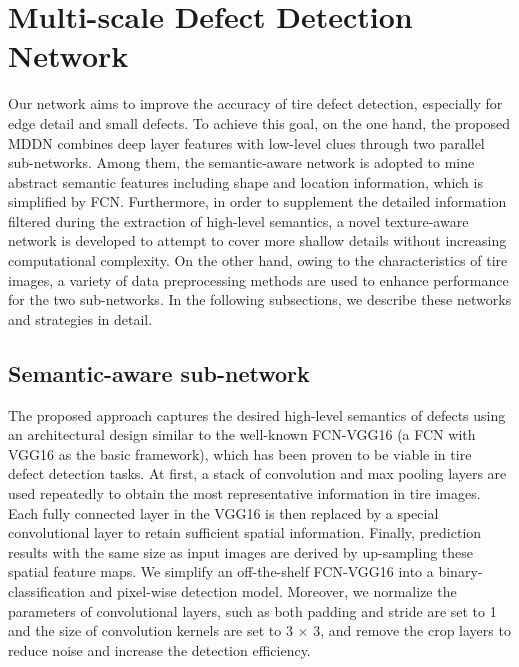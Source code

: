 \documentclass{article}
\begin{document}

\section{Multi-scale Defect Detection Network}
\label{sec:format}

Our network aims to improve the accuracy of tire defect detection, especially for edge detail and small defects. To achieve this goal, on the one hand, the proposed MDDN combines deep layer features with low-level clues through two parallel sub-networks. Among them, the semantic-aware network is adopted to mine abstract semantic features including shape and location information, which is simplified by FCN. Furthermore, in order to supplement the detailed information filtered during the extraction of high-level semantics, a novel texture-aware network is developed to attempt to cover more shallow details without increasing computational complexity. On the other hand, owing to the characteristics of tire images, a variety of data preprocessing methods are used to enhance performance for the two sub-networks. In the following subsections, we describe these networks and strategies in detail.

\subsection{Semantic-aware sub-network}
\label{Semantic-aware sub-network}
The proposed approach captures the desired high-level semantics of defects using an architectural design similar to the well-known FCN-VGG16 (a FCN with VGG16 as the basic framework), which has been proven to be viable in tire defect detection tasks. At first, a stack of convolution and max pooling layers are used repeatedly to obtain the most representative information in tire images. Each fully connected layer in the VGG16 is then replaced by a special convolutional layer to retain sufficient spatial information. Finally, prediction results with the same size as input images are derived by up-sampling these spatial feature maps. We simplify an off-the-shelf FCN-VGG16 into a binary-classification and pixel-wise detection model. Moreover, we normalize the parameters of convolutional layers, such as both padding and stride are set to 1 and the size of convolution kernels are set to 3 $\times$ 3, and remove the crop layers to reduce noise and increase the detection efficiency.
\end{document}
